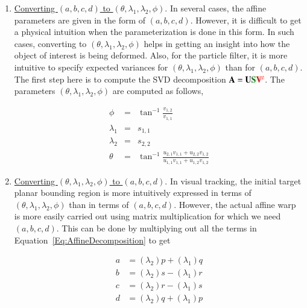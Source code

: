 \begin{enumerate} 
\item \underline{Converting $(a, b, c, d)$ to $(\theta, \lambda_1, \lambda_2, \phi)$}.  In several cases, the affine parameters are given in the form of $(a, b, c, d)$.  However, it is difficult to get a physical intuition when the parameterization is done in this form.  In such cases, converting to $(\theta, \lambda_1, \lambda_2, \phi)$ helps in getting an insight into how the object of interest is being deformed.  Also, for the particle filter, it is more intuitive to specify expected variances for $(\theta, \lambda_1, \lambda_2, \phi)$ than for $(a, b, c, d)$.  The first step here is to compute the SVD decomposition $\mathbf{A}=\mathbf{U}{\color{darkgreen}\mathbf{S}}{\color{red}\mathbf{V}^t}$.  The parameters $(\theta, \lambda_1, \lambda_2, \phi)$ are computed as follows,

\begin{equation}
\boxed{
\begin{array}{llll}
\phi &=& \tan^{-1}\frac{v_{1,2}}{v_{1,1}}\\
\lambda_1 &=&  s_{1,1}\\
\lambda_2 &=& s_{2,2}\\
\theta &=& \tan^{-1}\frac{u_{2,1}v_{1,1} + u_{2,2}v_{1,2}}{u_{1,1}v_{1,1} + u_{1,2}v_{1,2}}
\end{array}}
\end{equation}

\item \underline{Converting  $(\theta, \lambda_1, \lambda_2, \phi)$ to $(a, b, c, d)$}.  In visual tracking, the initial target planar bounding region is more intuitively expressed in terms of $(\theta, \lambda_1, \lambda_2, \phi)$ than in terms of $(a, b, c, d)$.  However, the actual affine warp is more easily carried out using matrix multiplication for which we need $(a, b, c, d)$.  This can be done by multiplying out all the terms in Equation~\ref{Eq:AffineDecomposition} to get

\begin{equation}
\boxed{
\begin{array}{llll}
a &= (\lambda_2) p + (\lambda_1) q\\
b &= (\lambda_2) s  - (\lambda_1) r \\
c &= (\lambda_2) r  - (\lambda_1) s \\
d &= (\lambda_2)q + (\lambda_1) p
\end{array}}
\label{Eqn:tllpxy_to_abcdxy}
\end{equation}


\end{enumerate}

